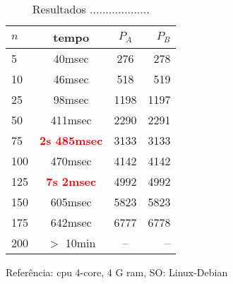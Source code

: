 \begin{table}
  \caption{Resultados ...................}
   \label{tab:}
  
  \begin{center}
  \begin{tabular}{ l | c |c | r }
    \hline  \hline 
    $n$ & tempo & $P_A$ & $P_B$\\ \hline     \hline 
     5 & 40msec & 276 & 278 \\ \hline
    10 & 46msec & 518 & 519 \\ \hline
    25 & 98msec & 1198 & 1197 \\ \hline
    50 & 411msec & 2290 & 2291 \\ \hline
    75 & \textbf{\textcolor{red}{2s 485msec}} & 3133 & 3133 \\ \hline
    100 & 470msec & 4142 & 4142 \\ \hline 
    125 & \textbf{\textcolor{red}{7s 2msec}} & 4992 & 4992 \\ \hline 
    150 & 605msec & 5823 & 5823 \\ \hline 
    175 & 642msec &   6777 &  6778 \\ \hline 
    200 & $>$ 10min & -- & -- \\ \hline \hline
  \end{tabular}
  
\end{center}

\end{table}
Referência: cpu 4-core, 4 G ram, SO: Linux-Debian


